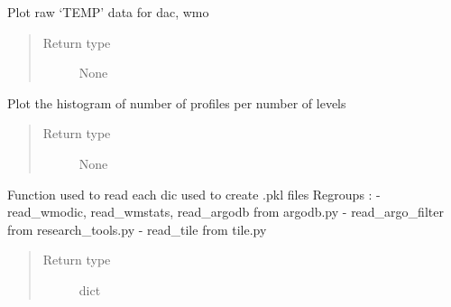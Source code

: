 \documentclass[letterpaper,10pt,english]{sphinxmanual}
\begin{document}

\begin{fulllineitems}
\label{\detokenize{pargopy:pargopy.argotools.plot_wmo_data}}
Plot raw ‘TEMP’ data for dac, wmo
\begin{quote}\begin{description}
\item[{Return type}] \leavevmode
None

\end{description}\end{quote}

\end{fulllineitems}


\begin{fulllineitems}
\label{\detokenize{pargopy:pargopy.argotools.plot_wmos_stats}}
Plot the histogram of number of profiles per number of levels
\begin{quote}\begin{description}
\item[{Return type}] \leavevmode
None

\end{description}\end{quote}

\end{fulllineitems}


\begin{fulllineitems}
\label{\detokenize{pargopy:pargopy.argotools.read_dic}}
Function used to read each dic used to create .pkl files
Regroups :
- read\_wmodic, read\_wmstats, read\_argodb from argodb.py
- read\_argo\_filter from research\_tools.py
- read\_tile from tile.py
\begin{quote}\begin{description}
\item[{Return type}] \leavevmode
dict

\end{description}\end{quote}

\end{fulllineitems}
\end{document}
